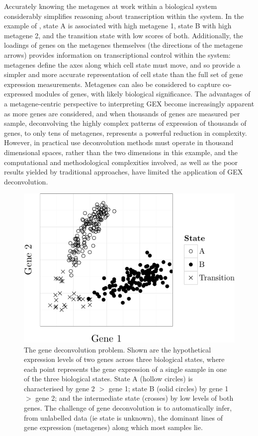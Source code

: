 \documentclass[dissertation.tex]{subfiles}
\begin{document}
Accurately knowing the metagenes at work within a biological system considerably simplifies reasoning about transcription within the system.  In the example of , state A is associated with high metagene 1, state B with high metagene 2, and the transition state with low scores of both.  Additionally, the loadings of genes on the metagenes themselves (the directions of the metagene arrows) provides information on transcriptional control within the system: metagenes define the axes along which cell state must move, and so provide a simpler and more accurate representation of cell state than the full set of gene expression measurements.  Metagenes can also be considered to capture co-expressed modules of genes, with likely biological significance.  The advantages of a metagene-centric perspective to interpreting \gls{GEX} become increasingly apparent as more genes are considered, and when thousands of genes are measured per sample, deconvolving the highly complex patterns of expression of thousands of genes, to only tens of metagenes, represents a powerful reduction in complexity.  However, in practical use deconvolution methods must operate in thousand dimensional spaces, rather than the two dimensions in this example, and the computational and methodological complexities involved, as well as the poor results yielded by traditional approaches, have limited the application of \gls{GEX} deconvolution.

\begin{figure}
\centering
\includegraphics[width=.7\linewidth]{analysis/biosurv/reports/PCA_ICA_NMF_comparison/figure/plots-1}
\caption[Illustration of the gene deconvolution problem]{The gene deconvolution problem.  Shown are the hypothetical expression levels of two genes across three biological states, where each point represents the gene expression of a single sample in one of the three biological states.  State A (hollow circles) is characterised by gene 2 $>$ gene 1; state B (solid circles) by gene 1 $>$ gene 2; and the intermediate state (crosses) by low levels of both genes.  The challenge of gene deconvolution is to automatically infer, from unlabelled data (ie state is unknown), the dominant lines of gene expression (metagenes) along which most samples lie.}\label{fig:sigs-example-matrixfactor-data}
\end{figure}
\end{document}
